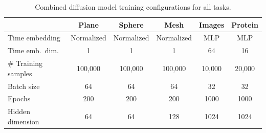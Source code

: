 \begin{table}[H]
\centering
\small
\setlength{\tabcolsep}{4pt}
\renewcommand{\arraystretch}{1.1}
\begin{tabular}{lccccc}
\toprule
& \textbf{Plane} & \textbf{Sphere} & \textbf{Mesh} & \textbf{Images} & \textbf{Protein} \\
\midrule
Time embedding & Normalized & Normalized & Normalized & MLP & MLP \\
Time emb.\ dim. & 1 & 1 & 1 & 64 & 16 \\
\# Training samples & 100{,}000 & 100{,}000 & 100{,}000 & 10{,}000 & 20{,}000 \\
Batch size & 64 & 64 & 64 & 32 & 32 \\
Epochs & 200 & 200 & 200 & 1000 & 1000 \\
Hidden dimension & 64 & 64 & 128 & 1024 & 1024 \\
\bottomrule
\end{tabular}
\caption{Combined diffusion model training configurations for all tasks.}
\end{table}
